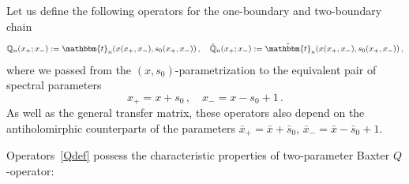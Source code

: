 \documentclass[a4paper,11pt]{article}
\numberwithin{equation}{section}
\begin{document}
Let us define the following operators for the one-boundary and two-boundary chain
\begin{align} \label{Qdef}
	\mathbb{Q}_n(x_+;x_-) := \mathbbm{t}_n(x(x_+,x_-), s_0(x_+,x_-)) \,, \quad
	\hat{\mathbb{Q}}_n(x_+;x_-) := \hat{\mathbbm{t}}_n(x(x_+,x_-), s_0(x_+,x_-)) \,,
\end{align}
where we passed from the $(x,s_0)$-parametrization to the equivalent pair of spectral parameters
\begin{equation} \label{x+-}
	x_+ = x + s_0 \,, \quad x_- = x - s_0 + 1 \,.
\end{equation}
As well as the general transfer matrix, these operators also depend on the antiholomirphic counterparts of the parameters $\bar{x}_+ = \bar{x} + \bar{s}_0$, $\bar{x}_- = \bar{x} - \bar{s}_0 + 1$.

Operators~\eqref{Qdef} possess the characteristic properties of two-parameter Baxter $Q$-operator:
\end{document}
